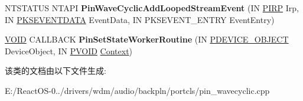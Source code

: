 \begin{DoxyCompactItemize}
\item 
\mbox{\label{class_c_port_pin_wave_cyclic_a2a57007da00aa58bfedc8b26b1e9ea96}} 
N\+T\+S\+T\+A\+T\+US N\+T\+A\+PI {\bfseries Pin\+Wave\+Cyclic\+Add\+Looped\+Stream\+Event} (IN \hyperlink{interfacevoid}{P\+I\+RP} Irp, IN \hyperlink{struct_k_s_e_v_e_n_t_d_a_t_a}{P\+K\+S\+E\+V\+E\+N\+T\+D\+A\+TA} Event\+Data, IN P\+K\+S\+E\+V\+E\+N\+T\+\_\+\+E\+N\+T\+RY Event\+Entry)
\item 
\mbox{\label{class_c_port_pin_wave_cyclic_a650236a60aaf59a04a9194393c1fe53c}} 
\hyperlink{interfacevoid}{V\+O\+ID} C\+A\+L\+L\+B\+A\+CK {\bfseries Pin\+Set\+State\+Worker\+Routine} (IN \hyperlink{struct___d_e_v_i_c_e___o_b_j_e_c_t}{P\+D\+E\+V\+I\+C\+E\+\_\+\+O\+B\+J\+E\+CT} Device\+Object, IN \hyperlink{interfacevoid}{P\+V\+O\+ID} \hyperlink{struct_context}{Context})
\end{DoxyCompactItemize}


该类的文档由以下文件生成\+:\begin{DoxyCompactItemize}
\item 
E\+:/\+React\+O\+S-\/0../drivers/wdm/audio/backpln/portcls/pin\+\_\+wavecyclic.\+cpp\end{DoxyCompactItemize}
